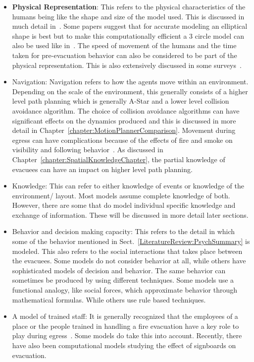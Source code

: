 \begin{itemize}
\item \textbf{Physical Representation}: This refers to the physical characteristics of the humans being like the shape and size of the model used. This is discussed in much detail in~\cite{Langston:2006kw,Still:2000tp}. Some papers suggest that for accurate modeling an elliptical shape is best but to make this computationally efficient a 3 circle model can also be used like in~\cite{Thompson:1995tm,Langston:2006kw}. The speed of movement of the humans and the time taken for pre-evacuation behavior can also be considered to be part of the physical representation. This is also extensively discussed in some surveys~\cite{Fahy:2010to,Proulx:1995wq}.

\item Navigation: Navigation refers to how the agents move within an environment. Depending on the scale of the environment, this generally consists of a higher level path planning which is generally A-Star and a lower level collision avoidance algorithm. The choice of collision avoidance algorithms can have significant effects on the dynamics produced and this is discussed in more detail in Chapter~\ref{chapter:MotionPlannerComparison}. Movement during egress can have complications because of the effects of fire and smoke on visibility and following behavior~\cite{Kobes:2009jx,Isobe:2003ep,Nagai:2004kl}. As discussed in Chapter~\ref{chapter:SpatialKnowledgeChapter}, the partial knowledge of evacuees can have an impact on higher level path planning.

\item Knowledge: This can refer to either knowledge of events or knowledge of the environment/ layout. Most models assume complete knowledge of both. However, there are some that do model individual specific knowledge and exchange of information. These will be discussed in more detail later sections.

\item Behavior and decision making capacity: This refers to the detail in which some of the behavior mentioned in Sect.~\ref{LiteratureReview:PsychSummary} is modeled. This also refers to the social interactions that takes place between the evacuees. Some models do not consider behavior at all, while others have sophisticated models of decision and behavior. The same behavior can sometimes be produced by using different techniques. Some models use a functional analogy, like social forces, which approximate behavior through mathematical formulas. While others use rule based techniques.

\item A model of trained staff: It is generally recognized that the employees of a place or the people trained in handling a fire evacuation have a key role to play during egress~\cite{Paulsen:1984ti,Aguirre:2004tn,Andree:2008td,Proulx:2001we}. Some models do take this into account. Recently, there have also been computational models studying the effect of signboards on evacuation.

\end{itemize}

